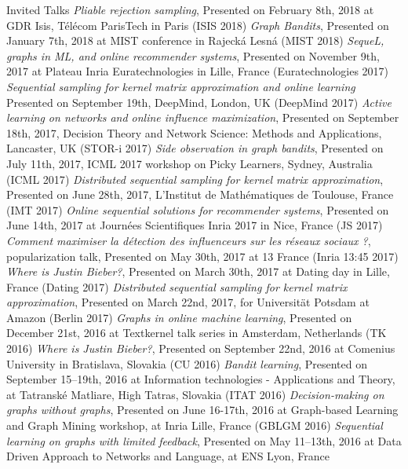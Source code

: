 \documentclass{resume}
\begin{document}
\begin{category}{Invited Talks}
\citembullet
\emph{Pliable rejection sampling}, Presented on February 8th, 2018 at GDR Isis, T\' el\' ecom ParisTech in Paris ({\sf ISIS 2018})
\citembullet
\emph{Graph Bandits}, Presented on January 7th, 2018 at MIST conference in Rajeck\' a Lesn\' a ({\sf MIST 2018})
\citembullet
\emph{SequeL, graphs in ML, and online recommender systems}, Presented on November 9th, 2017 at Plateau Inria Euratechnologies in Lille, France  
({\sf Euratechnologies 2017})
\citembullet
\emph{Sequential sampling for kernel matrix approximation and online learning}
Presented on September 19th, DeepMind, London, UK
({\sf DeepMind  2017})
\citembullet
\emph{Active learning on networks and online influence maximization}, Presented on  September 18th, 2017, Decision Theory and Network Science: Methods and Applications, Lancaster, UK 
({\sf STOR-i  2017})
\citembullet
\emph{Side observation in graph bandits}, Presented on July 11th, 2017, ICML 2017 workshop on Picky Learners, Sydney, Australia ({\sf ICML 2017})
\citembullet
\emph{Distributed sequential sampling for kernel matrix approximation}, Presented on June 28th, 2017, L'Institut de Math\' ematiques de Toulouse, France
({\sf IMT 2017})
\citembullet
\emph{Online sequential solutions for recommender systems}, Presented on June 14th, 2017 at Journ\'ees Scientifiques Inria 2017 in Nice, France  
({\sf JS 2017})
\citembullet
\emph{Comment maximiser la d\'etection des influenceurs sur les r\'eseaux sociaux ?}, popularization talk, Presented on May 30th, 2017  at 13 France 
({\sf Inria 13:45 2017})
\citembullet
\emph{Where is Justin Bieber?}, Presented on March 30th, 2017  at Dating day  in Lille, France 
({\sf Dating 2017})
\citembullet
\emph{Distributed sequential sampling for kernel matrix approximation}, Presented on  March 22nd, 2017, for Universit\" at Potsdam at Amazon 
({\sf Berlin 2017})
\citembullet
\emph{Graphs in online machine learning}, Presented on December 21st, 2016 at Textkernel talk series in Amsterdam, Netherlands 
({\sf TK 2016})
\citembullet
\emph{Where is Justin Bieber?}, Presented on September 22nd, 2016 at Comenius University in Bratislava, Slovakia 
({\sf CU 2016})
\citembullet
\emph{Bandit learning}, Presented on September 15--19th, 2016 at Information technologies - Applications and Theory, at Tatransk\' e Matliare, High Tatras, Slovakia
({\sf ITAT 2016})
\citembullet
\emph{Decision-making on graphs without graphs}, Presented on June 16-17th, 2016 at Graph-based Learning and Graph Mining workshop, at Inria Lille, France
({\sf GBLGM 2016})
\citembullet
\emph{Sequential learning on graphs with limited feedback}, Presented on May 11--13th, 2016 at Data Driven Approach to Networks and Language, at ENS Lyon, France

\end{category}
\end{document}
